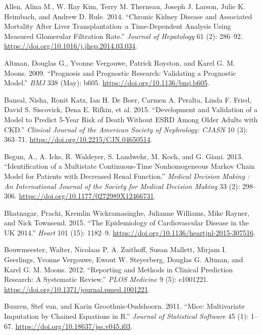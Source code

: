 \documentclass[
]{article}
\newlength{\cslhangindent}
\newenvironment{cslreferences}%
  {\setlength{\parindent}{0pt}%
  \everypar{\setlength{\hangindent}{\cslhangindent}}\ignorespaces}%
  {\par}
\begin{document}
\hypertarget{refs}{}
\begin{cslreferences}
\leavevmode\hypertarget{ref-allen_chronic_2014}{}%
Allen, Alina M., W. Ray Kim, Terry M. Therneau, Joseph J. Larson, Julie K. Heimbach, and Andrew D. Rule. 2014. ``Chronic Kidney Disease and Associated Mortality After Liver Transplantation--a Time-Dependent Analysis Using Measured Glomerular Filtration Rate.'' \emph{Journal of Hepatology} 61 (2): 286--92. \url{https://doi.org/10.1016/j.jhep.2014.03.034}.

\leavevmode\hypertarget{ref-altman_prognosis_2009}{}%
Altman, Douglas G., Yvonne Vergouwe, Patrick Royston, and Karel G. M. Moons. 2009. ``Prognosis and Prognostic Research: Validating a Prognostic Model.'' \emph{BMJ} 338 (May): b605. \url{https://doi.org/10.1136/bmj.b605}.

\leavevmode\hypertarget{ref-bansal_development_2015}{}%
Bansal, Nisha, Ronit Katz, Ian H. De Boer, Carmen A. Peralta, Linda F. Fried, David S. Siscovick, Dena E. Rifkin, et al. 2015. ``Development and Validation of a Model to Predict 5-Year Risk of Death Without ESRD Among Older Adults with CKD.'' \emph{Clinical Journal of the American Society of Nephrology: CJASN} 10 (3): 363--71. \url{https://doi.org/10.2215/CJN.04650514}.

\leavevmode\hypertarget{ref-begun_identification_2013}{}%
Begun, A., A. Icks, R. Waldeyer, S. Landwehr, M. Koch, and G. Giani. 2013. ``Identification of a Multistate Continuous-Time Nonhomogeneous Markov Chain Model for Patients with Decreased Renal Function.'' \emph{Medical Decision Making : An International Journal of the Society for Medical Decision Making} 33 (2): 298--306. \url{https://doi.org/10.1177/0272989X12466731}.

\leavevmode\hypertarget{ref-bhatnagar_epidemiology_2015}{}%
Bhatnagar, Prachi, Kremlin Wickramasinghe, Julianne Williams, Mike Rayner, and Nick Townsend. 2015. ``The Epidemiology of Cardiovascular Disease in the UK 2014.'' \emph{Heart} 101 (15): 1182--9. \url{https://doi.org/10.1136/heartjnl-2015-307516}.

\leavevmode\hypertarget{ref-bouwmeester_reporting_2012-1}{}%
Bouwmeester, Walter, Nicolaas P. A. Zuithoff, Susan Mallett, Mirjam I. Geerlings, Yvonne Vergouwe, Ewout W. Steyerberg, Douglas G. Altman, and Karel G. M. Moons. 2012. ``Reporting and Methods in Clinical Prediction Research: A Systematic Review.'' \emph{PLOS Medicine} 9 (5): e1001221. \url{https://doi.org/10.1371/journal.pmed.1001221}.

\leavevmode\hypertarget{ref-buuren_mice_2011-1}{}%
Buuren, Stef van, and Karin Groothuis-Oudshoorn. 2011. ``Mice: Multivariate Imputation by Chained Equations in R.'' \emph{Journal of Statistical Software} 45 (1): 1--67. \url{https://doi.org/10.18637/jss.v045.i03}.


\end{cslreferences}
\end{document}

